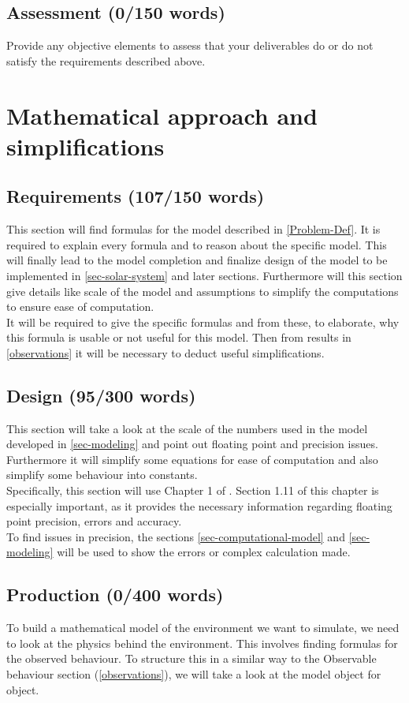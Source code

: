 \documentclass[conference,compsoc]{IEEEtran}
\begin{document}
\subsection{Assessment (0/150 words)}
Provide any objective elements to assess that your deliverables do or do not satisfy the requirements described above. 

\section{Mathematical approach and simplifications}
\label{sec-simplify}
\subsection{Requirements (107/150 words)}
This section will find formulas for the model described in \ref{Problem-Def}. It is required to explain every formula and to reason about the specific model. This will finally lead to the model completion and finalize design of the model to be implemented in \ref{sec-solar-system} and later sections. Furthermore will this section give details like scale of the model and assumptions to simplify the computations to ensure ease of computation. \\
It will be required to give the specific formulas and from these, to elaborate, why this formula is usable or not useful for this model. Then from results in \ref{observations} it will be necessary to deduct useful simplifications.
\subsection{Design (95/300 words)}
This section will take a look at the scale of the numbers used in the model developed in \ref{sec-modeling} and point out floating point and precision issues. Furthermore it will simplify some equations for ease of computation and also simplify some behaviour into constants.\\
Specifically, this section will use Chapter 1 of \cite{ComputationalModelsIntroduction}. Section 1.11 of this chapter is especially important, as it provides the necessary information regarding floating point precision, errors and accuracy. \\
To find issues in precision, the sections \ref{sec-computational-model} and \ref{sec-modeling} will be used to show the errors or complex calculation made.
\subsection{Production (0/400 words)}
To build a mathematical model of the environment we want to simulate, we need to look at the physics behind the environment. This involves finding formulas for the observed behaviour. To structure this in a similar way to the Observable behaviour section (\ref{observations}), we will take a look at the model object for object.
\end{document}
